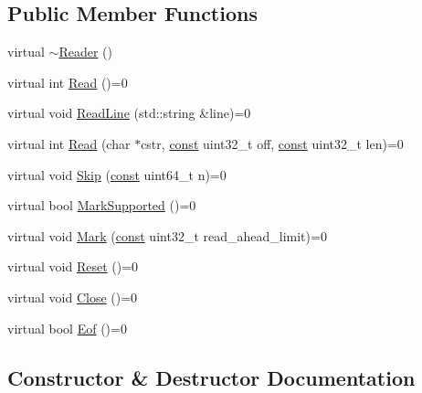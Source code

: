 \subsection*{Public Member Functions}
\begin{DoxyCompactItemize}
\item 
virtual \mbox{\hyperlink{classlucene_1_1core_1_1analysis_1_1Reader_a78089542fd27a0ac2df6702fffe8725c}{$\sim$\+Reader}} ()
\item 
virtual int \mbox{\hyperlink{classlucene_1_1core_1_1analysis_1_1Reader_ae8e04911b6a4c06bb026ca6e74071cb2}{Read}} ()=0
\item 
virtual void \mbox{\hyperlink{classlucene_1_1core_1_1analysis_1_1Reader_a475ba046fd74e43a1cce4c4702c791c2}{Read\+Line}} (std\+::string \&line)=0
\item 
virtual int \mbox{\hyperlink{classlucene_1_1core_1_1analysis_1_1Reader_a986e25a49a947dc113a22c6de033ebe9}{Read}} (char $\ast$cstr, \mbox{\hyperlink{ZlibCrc32_8h_a2c212835823e3c54a8ab6d95c652660e}{const}} uint32\+\_\+t off, \mbox{\hyperlink{ZlibCrc32_8h_a2c212835823e3c54a8ab6d95c652660e}{const}} uint32\+\_\+t len)=0
\item 
virtual void \mbox{\hyperlink{classlucene_1_1core_1_1analysis_1_1Reader_a3bd8e9f3e1d07d698bccabde41970219}{Skip}} (\mbox{\hyperlink{ZlibCrc32_8h_a2c212835823e3c54a8ab6d95c652660e}{const}} uint64\+\_\+t n)=0
\item 
virtual bool \mbox{\hyperlink{classlucene_1_1core_1_1analysis_1_1Reader_a230fae02ca4a63de33fdaad6f9aafd96}{Mark\+Supported}} ()=0
\item 
virtual void \mbox{\hyperlink{classlucene_1_1core_1_1analysis_1_1Reader_a0b60b07a3f65098a50f10f6618097527}{Mark}} (\mbox{\hyperlink{ZlibCrc32_8h_a2c212835823e3c54a8ab6d95c652660e}{const}} uint32\+\_\+t read\+\_\+ahead\+\_\+limit)=0
\item 
virtual void \mbox{\hyperlink{classlucene_1_1core_1_1analysis_1_1Reader_a5299f5469ce4ea9812ec79a59667945a}{Reset}} ()=0
\item 
virtual void \mbox{\hyperlink{classlucene_1_1core_1_1analysis_1_1Reader_a4be7e96dccdd3e276e3450e3ad7a70f4}{Close}} ()=0
\item 
virtual bool \mbox{\hyperlink{classlucene_1_1core_1_1analysis_1_1Reader_af7a24f3904f9c40e9c5c204b3434f1f7}{Eof}} ()=0
\end{DoxyCompactItemize}


\subsection{Constructor \& Destructor Documentation}
\mbox{\label{classlucene_1_1core_1_1analysis_1_1Reader_a78089542fd27a0ac2df6702fffe8725c}} 
